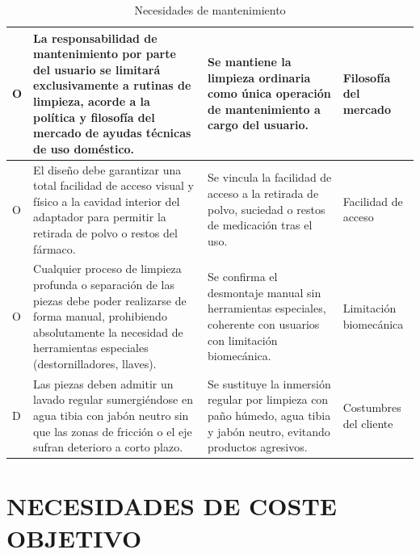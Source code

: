 \documentclass[11pt,a4paper]{article}
\begin{document}
\begin{table}[H]
\begin{tabular}{|p{2.8cm}|p{5.5cm}|p{2.5cm}|p{3.0cm}|}
\hline
O & La responsabilidad de mantenimiento por parte del usuario se limitará exclusivamente a rutinas de limpieza, acorde a la política y filosofía del mercado de ayudas técnicas de uso doméstico. & Se mantiene la limpieza ordinaria como única operación de mantenimiento a cargo del usuario. & Filosofía del mercado \\
\hline
O & El diseño debe garantizar una total facilidad de acceso visual y físico a la cavidad interior del adaptador para permitir la retirada de polvo o restos del fármaco. & Se vincula la facilidad de acceso a la retirada de polvo, suciedad o restos de medicación tras el uso. & Facilidad de acceso \\
\hline
O & Cualquier proceso de limpieza profunda o separación de las piezas debe poder realizarse de forma manual, prohibiendo absolutamente la necesidad de herramientas especiales (destornilladores, llaves). & Se confirma el desmontaje manual sin herramientas especiales, coherente con usuarios con limitación biomecánica. & Limitación biomecánica \\
\hline
D & Las piezas deben admitir un lavado regular sumergiéndose en agua tibia con jabón neutro sin que las zonas de fricción o el eje sufran deterioro a corto plazo. & Se sustituye la inmersión regular por limpieza con paño húmedo, agua tibia y jabón neutro, evitando productos agresivos. & Costumbres del cliente \\
\hline
\end{tabular}
\caption{Necesidades de mantenimiento}
\end{table}

\newpage

\section{NECESIDADES DE COSTE OBJETIVO}
\end{document}
